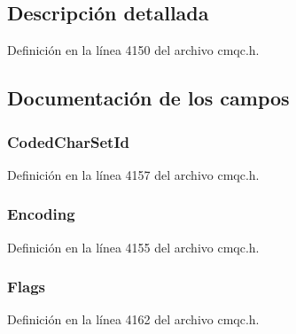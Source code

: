\subsection{Descripción detallada}


Definición en la línea 4150 del archivo cmqc.\+h.



\subsection{Documentación de los campos}
\hypertarget{structtag_m_q_d_h_a4d8d1961a991850d1355cdf9b4680b8e}{}
\subsubsection[{Coded\+Char\+Set\+Id}]{ Coded\+Char\+Set\+Id}\label{structtag_m_q_d_h_a4d8d1961a991850d1355cdf9b4680b8e}


Definición en la línea 4157 del archivo cmqc.\+h.

\hypertarget{structtag_m_q_d_h_a30167bf454a49a60fd3fe4e9e586af34}{}
\subsubsection[{Encoding}]{ Encoding}\label{structtag_m_q_d_h_a30167bf454a49a60fd3fe4e9e586af34}


Definición en la línea 4155 del archivo cmqc.\+h.

\hypertarget{structtag_m_q_d_h_a8da770267273b200fa9c968fa2a0da57}{}
\subsubsection[{Flags}]{ Flags}\label{structtag_m_q_d_h_a8da770267273b200fa9c968fa2a0da57}


Definición en la línea 4162 del archivo cmqc.\+h.

\hypertarget{structtag_m_q_d_h_a435a478822008713f8aaff89f369ed63}{}
